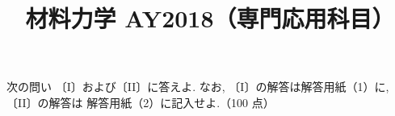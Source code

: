 \documentclass[11pt,a4paper]{article}
\title{材料力学 AY2018（専門応用科目）}
\author{}
\date{}
\begin{document}
\maketitle

\noindent
次の問い 〔I〕および〔II〕に答えよ. なお, 〔I〕の解答は解答用紙（1）に, 〔II〕の解答は
解答用紙（2）に記入せよ.\hfill（100 点）

\bigskip

\clearpage

\end{document}
